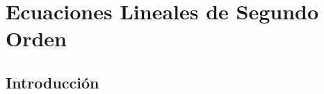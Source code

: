 % 
% 
% 
% 
% 
% 
% 
% 
% 
% 
% 
% 
% 
% 
% 




\chapter{Ecuaciones Lineales de Segundo Orden}

%








\section{Introducción}


